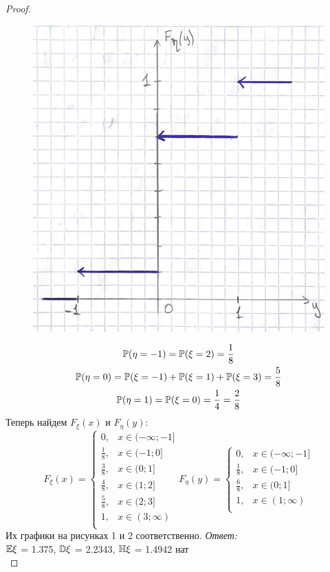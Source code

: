 \begin{proof}
\begin{figure}[h!]
    \caption{}
    \label{fig:enter-label}
\end{figure}
\begin{figure}[h!]
    \centering
    \includegraphics[width=0.5\linewidth]{2.jpg}
    \caption{}
    \label{fig:enter-label}
\end{figure}
\begin{gather*}
    \mathbb P(\eta = -1) = \mathbb P(\xi = 2) = \frac{1}{8}\\
    \mathbb P(\eta = 0) = \mathbb P(\xi = -1) +  \mathbb P(\xi = 1) + \mathbb P(\xi = 3)= \frac{5}{8}\\
    \mathbb P(\eta = 1) = \mathbb P(\xi = 0) = \frac{1}{4} = \frac{2}{8}\\
\end{gather*}
Теперь найдем $ F_{\xi}(x)$ и $ F_{\eta}(y)$:
\[ 
F_{\xi}(x) = \begin{cases} 
          0, & x\in (-\infty; -1] \\
          \frac{1}{8}, & x\in (-1; 0] \\
          \frac{3}{8}, & x\in (0; 1] \\
          \frac{4}{8}, & x\in (1; 2] \\
          \frac{5}{8}, & x\in (2; 3] \\
          1, & x\in (3; \infty) \\
       \end{cases}
F_{\eta}(y) = \begin{cases} 
          0, & x\in (-\infty; -1] \\
          \frac{1}{8}, & x\in (-1; 0] \\
          \frac{6}{8}, & x\in (0; 1] \\
          1, & x\in (1; \infty) \\
       \end{cases}
\]
Их графики на рисунках 1 и 2 соответственно.
{\it Ответ:}\\
$\mathbb E\xi$ = 1.375, $\mathbb D\xi$ = 2.2343, $\mathbb H\xi$ = 1.4942 нат\\

\end{proof}

